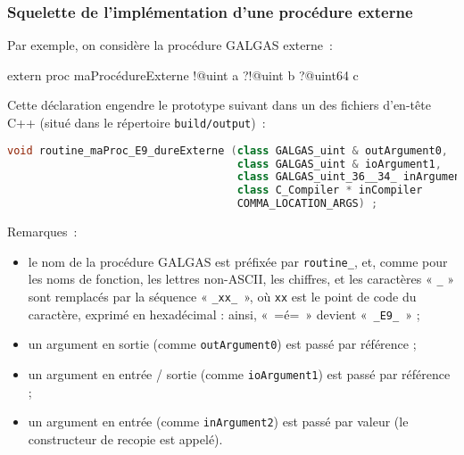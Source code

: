 \subsubsection{Squelette de l'implémentation d'une procédure externe}

Par exemple, on considère la procédure GALGAS externe~:
\begin{galgas3}
extern proc maProcédureExterne !@uint a ?!@uint b ?@uint64 c
\end{galgas3}

Cette déclaration engendre le prototype suivant dans un des fichiers d'en-tête C++ (situé dans le répertoire \texttt{build/output})~:
\begin{lstlisting}[language=C++]
void routine_maProc_E9_dureExterne (class GALGAS_uint & outArgument0,
                                    class GALGAS_uint & ioArgument1,
                                    class GALGAS_uint_36__34_ inArgument2,
                                    class C_Compiler * inCompiler
                                    COMMA_LOCATION_ARGS) ;
\end{lstlisting}

Remarques~:
\begin{itemize}
  \item le nom de la procédure GALGAS est préfixée par \texttt{routine\_}, et, comme pour les noms de fonction, les lettres non-ASCII, les chiffres, et les caractères « \texttt{\_} »  sont remplacés par la séquence « \texttt{\_xx\_ }», où \texttt{xx} est le point de code du caractère, exprimé en hexadécimal : ainsi, «~\ggst=é=~» devient «~\texttt{\_E9\_}~» ;
  \item un argument en sortie (comme \texttt{outArgument0}) est passé par référence ;
  \item un argument en entrée / sortie (comme \texttt{ioArgument1}) est passé par référence ;
  \item un argument en entrée (comme \texttt{inArgument2}) est passé par valeur (le constructeur de recopie est appelé).
\end{itemize}


